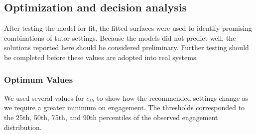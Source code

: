 \documentclass[12pt]{article}
\begin{document}
\subsection{Optimization and decision analysis}
\label{sec:optimization}

After testing the model for fit, the fitted surfaces were used to
identify promising combinations of tutor settings. Because the models
did not predict well, the solutions
reported here should be considered preliminary. Further testing should be completed before these values are adopted into real systems.

\subsubsection{Optimum Values}
We used several values for $e_{th}$ to show how the recommended
settings change as we require a greater minimum on engagement. The
thresholds corresponded to the 25th, 50th, 75th, and 90th
percentiles of the observed engagement distribution.
\end{document}
